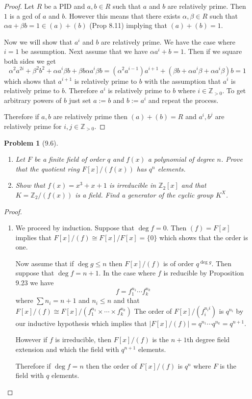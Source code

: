 \documentclass[10pt]{article}
\newcommand{\sk}{\vskip 10mm}
\newcommand{\bb}[1]{\mathbb{#1}}
\theoremstyle{plain}
\newtheorem{problem}{Problem}
\theoremstyle{remark}
\begin{document}
\begin{proof}
  Let $R$ be a PID and $a,b\in R$ such that $a$ and $b$ are relatively prime.
  Then $1$ is a gcd of $a$ and $b$. However this means that
  there exists $\alpha,\beta\in R$ such that $\alpha a+\beta b = 1\in (a)+(b)$ (Prop 8.11) implying that
  $(a)+(b)=1$.

  Now we will show that $a^i$ and $b$ are relatively prime. We have the case where
  $i=1$ be assumption. Next assume that we have $\alpha a^i+b=1$. Then if we square
  both sides we get
  \[ \alpha^2a^{2i}+\beta^2b^2+\alpha a^i\beta b+\beta b \alpha a^i \beta b = (\alpha^2a^{i-1})a^{i+1}+(\beta b+\alpha a^i \beta +\alpha a^i\beta)b=1 \]
  which shows that $a^{i+1}$ is relatively prime to $b$ with the assumption that
  $a^i$ is relatively prime to $b$. Therefore $a^i$ is relatively prime to $b$ where
  $i\in \bb{Z}_{>0}$. To get arbitrary powers of $b$ just set $a:=b$ and $b:=a^i$
  and repeat the process.

  Therefore if $a,b$ are relatively prime then $(a)+(b)=R$ and $a^i,b^j$ are relatively
  prime for $i,j\in\bb{Z}_{>0}$.
\end{proof}

\sk


\begin{problem}[9.6]
  \begin{enumerate}
  \item Let $F$ be a finite field of order $q$ and $f(x)$ a polynomial of degree
    $n$. Prove that the quotient ring $F[x]/(f(x))$ has $q^n$ elements.
  \item Show that $f(x)=x^3+x+1$ is irreducible in $\bb{Z}_2[x]$ and that
    $K=\bb{Z}_2/(f(x))$ is a field. Find a generator of the cyclic group
    $K^X$.
  \end{enumerate}
\end{problem}

\begin{proof}
  \begin{enumerate}
  \item We proceed by induction. Suppose that $\deg f=0$. Then $(f)=F[x]$
    implies that $F[x]/(f)\cong F[x]/F[x]=\{0\}$ which shows that the order is one.

    Now assume that if $\deg g \leq n$ then $F[x]/(f)$ is of order $q^{\deg g}$.
    Then suppose that $\deg f = n+1$. In the case where $f$ is reducible
    by Proposition 9.23 we have
    \[ f=f_1^{n_1}\cdots f_k^{n_k} \]
    where $\sum n_i=n+1$ and $n_i\leq n$ and that
    $F[x]/(f) \cong F[x]/(f_1^{n_1}\times\cdots\times f_k^{n_k})$
    The order of $F[x]/(f_i^{n_ii})$ is $q^{n_i}$ by our inductive hypothesis
    which implies that $|F[x]/(f)|=q^{n_1}\cdots q^{n_k}=q^{n+1}$.

    However if $f$ is irreducible, then $F[x]/(f)$ is the $n+1$th degree
    field extension and which the field with $q^{n+1}$ elements.

    Therefore if $\deg f=n$ then the order of $F[x]/(f)$ is $q^n$ where
    $F$ is the field with $q$ elements.
  \end{enumerate}
\end{proof}
\end{document}
